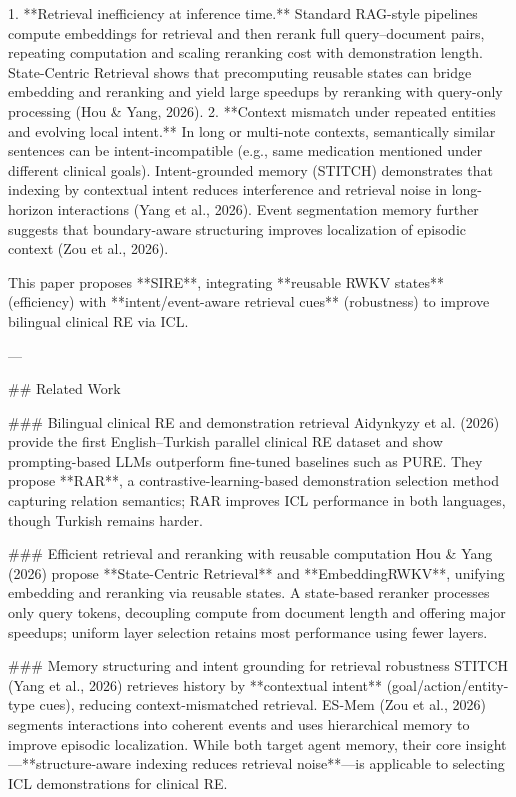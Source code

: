 1. **Retrieval inefficiency at inference time.** Standard RAG-style pipelines compute embeddings for retrieval and then rerank full query–document pairs, repeating computation and scaling reranking cost with demonstration length. State-Centric Retrieval shows that precomputing reusable states can bridge embedding and reranking and yield large speedups by reranking with query-only processing (Hou & Yang, 2026).  
2. **Context mismatch under repeated entities and evolving local intent.** In long or multi-note contexts, semantically similar sentences can be intent-incompatible (e.g., same medication mentioned under different clinical goals). Intent-grounded memory (STITCH) demonstrates that indexing by contextual intent reduces interference and retrieval noise in long-horizon interactions (Yang et al., 2026). Event segmentation memory further suggests that boundary-aware structuring improves localization of episodic context (Zou et al., 2026).

This paper proposes **SIRE**, integrating **reusable RWKV states** (efficiency) with **intent/event-aware retrieval cues** (robustness) to improve bilingual clinical RE via ICL.

---

## Related Work  

### Bilingual clinical RE and demonstration retrieval  
Aidynkyzy et al. (2026) provide the first English–Turkish parallel clinical RE dataset and show prompting-based LLMs outperform fine-tuned baselines such as PURE. They propose **RAR**, a contrastive-learning-based demonstration selection method capturing relation semantics; RAR improves ICL performance in both languages, though Turkish remains harder.

### Efficient retrieval and reranking with reusable computation  
Hou & Yang (2026) propose **State-Centric Retrieval** and **EmbeddingRWKV**, unifying embedding and reranking via reusable states. A state-based reranker processes only query tokens, decoupling compute from document length and offering major speedups; uniform layer selection retains most performance using fewer layers.

### Memory structuring and intent grounding for retrieval robustness  
STITCH (Yang et al., 2026) retrieves history by **contextual intent** (goal/action/entity-type cues), reducing context-mismatched retrieval. ES-Mem (Zou et al., 2026) segments interactions into coherent events and uses hierarchical memory to improve episodic localization. While both target agent memory, their core insight—**structure-aware indexing reduces retrieval noise**—is applicable to selecting ICL demonstrations for clinical RE.

